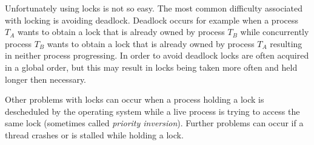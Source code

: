 % 
% 

Unfortunately using locks is not so easy.
The most common difficulty associated with locking
is avoiding deadlock.
Deadlock occurs for example when a process $T_A$ wants to obtain a lock that
is already owned by process $T_B$ while concurrently process $T_B$ wants
to obtain a lock that is already owned by process $T_A$ resulting
in neither process progressing.
In order to avoid deadlock locks are often acquired in a global order,
but this may result in locks being taken more often and held longer then necessary.

Other problems with locks can occur when a process holding a lock
is descheduled by the operating system while a live process is trying to
access the same lock (sometimes called \emph{priority inversion}).
Further problems can occur if a thread crashes or is stalled while
holding a lock.


